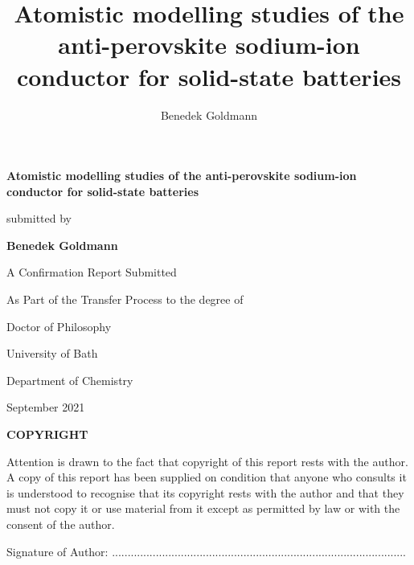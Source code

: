 \documentclass[12pt]{report}
\title{Atomistic modelling studies of the anti-perovskite \ch{Na3OCl} sodium-ion conductor for solid-state batteries}
\author{Benedek Goldmann}
\begin{document}
\begin{titlepage}
   \begin{center}
      \vspace*{0.7 cm}
      
      {\Large\textbf{Atomistic modelling studies of the anti-perovskite  sodium-ion conductor for solid-state batteries} \par}

       \vspace{0.7 cm}
        
       submitted by
            
       \vspace{0.7 cm}

       {\Large\textbf{Benedek Goldmann} \par}
       
       \vspace{0.7cm}
       
       A Confirmation Report Submitted
       
       As Part of the Transfer Process to the degree of
       
       Doctor of Philosophy
       
       \vspace{0.7 cm}
       
       {\Large{University of Bath} \par}
       
       Department of Chemistry
       
       \vspace{0.7 cm}
       
       September 2021
       
       \vspace{2 cm}
       
       {\large\textbf{COPYRIGHT}}
   \end{center}
   
   \noindent   
   Attention is drawn to the fact that copyright of this report rests with the author. 
   A copy of this report has been supplied on condition that anyone who consults it is understood to recognise that its copyright rests with the author and that they must not copy it or use material from it except as permitted by law or with the consent of the author.
   
\vspace{0.7 cm}   
   
   \noindent
   Signature of Author: ..............................................................................................
\end{titlepage}
\end{document}
